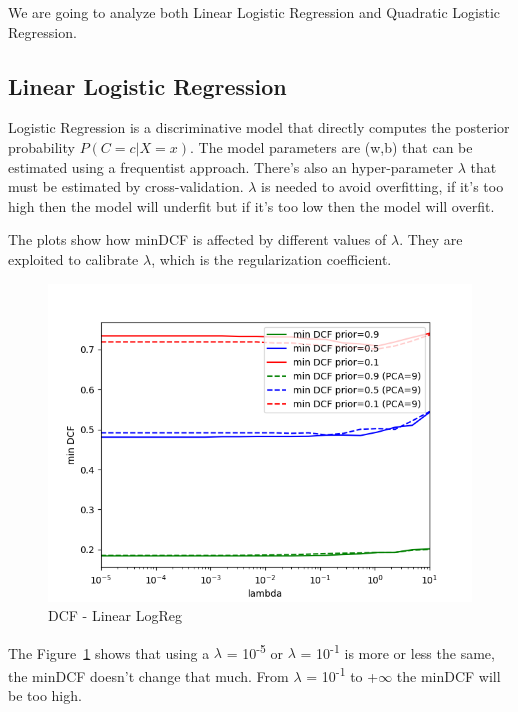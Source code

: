 \documentclass[english]{report}
\begin{document}
We are going to analyze both Linear Logistic Regression and Quadratic Logistic Regression.
\subsection{Linear Logistic Regression}

Logistic Regression is a discriminative model that directly computes the posterior probability \(P(C=c|X=x)\).
The model parameters are (w,b) that can be estimated using a frequentist approach.
There's also an hyper-parameter $\lambda$ that must be estimated by cross-validation. $\lambda$ is needed to avoid overfitting, if it's too high then the model will
underfit but if it's too low then the model will overfit.\newline

The plots show how minDCF is affected by different values of $\lambda$.
They are exploited to calibrate $\lambda$, which is the regularization coefficient.

\begin{figure}[H]
    \centering
    \includegraphics[scale=0.5]{../../images/validation/LR_PCA_minDCF_comparison}
    \caption{DCF - Linear LogReg}
    \label{fig:DCF_LinearLogReg_valid}
\end{figure}

The Figure~\ref{fig:DCF_LinearLogReg_valid} shows that using a $\lambda$ = 10\textsuperscript{-5} or $\lambda$ = 10\textsuperscript{-1}
is more or less the same, the minDCF doesn't change that much.
From $\lambda$ = 10\textsuperscript{-1} to +$\infty$ the minDCF will be too high.
\end{document}
